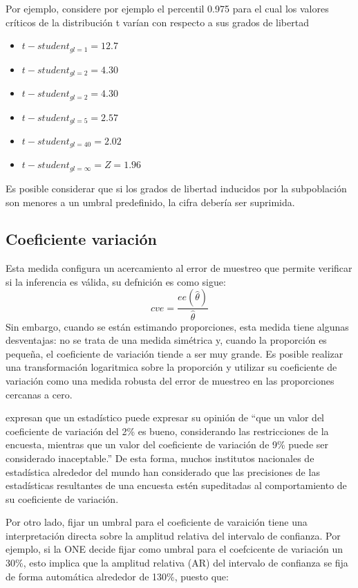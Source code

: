 \documentclass[12pt,spanish,]{book}
\providecommand{\tightlist}{%
  \setlength{\itemsep}{0pt}\setlength{\parskip}{0pt}}
\begin{document}
Por ejemplo, considere por ejemplo el percentil 0.975 para el cual los valores críticos de la distribución t varían con respecto a sus grados de libertad

\begin{itemize}
\tightlist
\item
  \(t-student_{gl = 1} = 12.7\)
\item
  \(t-student_{gl = 2} = 4.30\)
\item
  \(t-student_{gl = 2} = 4.30\)
\item
  \(t-student_{gl = 5} = 2.57\)
\item
  \(t-student_{gl = 40} = 2.02\)
\item
  \(t-student_{gl = \infty} = Z = 1.96\)
\end{itemize}

Es posible considerar que si los grados de libertad inducidos por la subpoblación son menores a un umbral predefinido, la cifra debería ser suprimida.

\hypertarget{coeficiente-variacion}{%
\subsection*{Coeficiente variación}\label{coeficiente-variacion}}

Esta medida configura un acercamiento al error de muestreo que permite verificar si la inferencia es válida, su defnición es como sigue:
\[
cve = \frac{ee(\hat\theta)}{\hat\theta}
\]
Sin embargo, cuando se están estimando proporciones, esta medida tiene algunas desventajas: no se trata de una medida simétrica y, cuando la proporción es pequeña, el coeficiente de variación tiende a ser muy grande. Es posible realizar una transformación logaritmica sobre la proporción y utilizar su coeficiente de variación como una medida robusta del error de muestreo en las proporciones cercanas a cero.

\textcite{Sarndal_Swensson_Wretman_2003} expresan que un estadístico puede expresar su opinión de ``que un valor del coeficiente de variación del 2\% es bueno, considerando las restricciones de la encuesta, mientras que un valor del coeficiente de variación de 9\% puede ser considerado inaceptable.'' De esta forma, muchos institutos nacionales de estadística alrededor del mundo han considerado que las precisiones de las estadísticas resultantes de una encuesta estén supeditadas al comportamiento de su coeficiente de variación.

Por otro lado, fijar un umbral para el coeficiente de varaición tiene una interpretación directa sobre la amplitud relativa del intervalo de confianza. Por ejemplo, si la ONE decide fijar como umbral para el coefcicente de variación un 30\%, esto implica que la amplitud relativa (AR) del intervalo de confianza se fija de forma automática alrededor de 130\%, puesto que:
\end{document}
